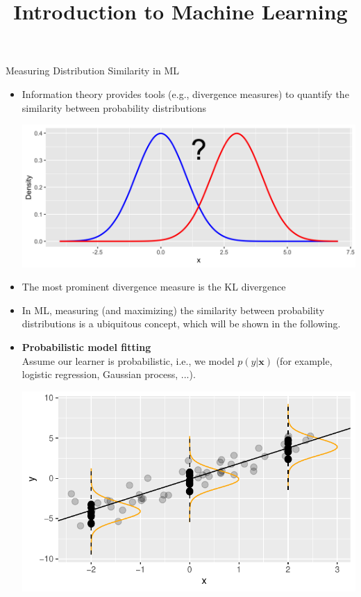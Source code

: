 \documentclass[11pt,compress,t,notes=noshow, xcolor=table]{beamer}
\title{Introduction to Machine Learning}
\begin{document}
    

\begin{vbframe} {Measuring Distribution Similarity in ML}
\begin{itemize}
    \item Information theory provides tools (e.g., divergence measures) to quantify the similarity between probability distributions
    
    \begin{center}
    \includegraphics[width=0.7\linewidth]{figure/normal_distributions.png}
    \end{center}
    
    \item The most prominent divergence measure is the KL divergence 
\item In ML, measuring (and maximizing) the similarity between probability distributions is a ubiquitous concept, which will be shown in the following.
\end{itemize}
\framebreak
\begin{itemize}
    \item \textbf{Probabilistic model fitting}\\
Assume our learner is probabilistic, i.e., we model $p(y| \mathbf{x})$ (for example, logistic regression, Gaussian process, ...).

\begin{center}
\includegraphics[width=0.5\linewidth]{figure/ftrue.pdf}
\end{center}


\end{itemize}
\end{vbframe}
\end{document}
